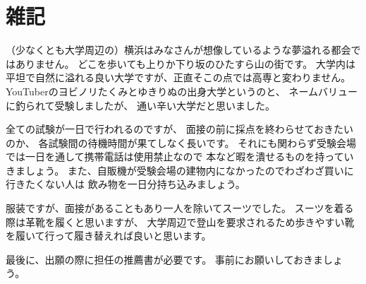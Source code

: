 \documentclass[]{jsarticle}
\begin{document}
\section*{雑記}
    （少なくとも大学周辺の）横浜はみなさんが想像しているような夢溢れる都会ではありません。
    どこを歩いても上りか下り坂のひたすら山の街です。
    大学内は平坦で自然に溢れる良い大学ですが、正直そこの点では高専と変わりません。
    YouTuberのヨビノリたくみとゆきりぬの出身大学というのと、
    ネームバリューに釣られて受験しましたが、
    通い辛い大学だと思いました。

    全ての試験が一日で行われるのですが、
    面接の前に採点を終わらせておきたいのか、
    各試験間の待機時間が果てしなく長いです。
    それにも関わらず受験会場では一日を通して携帯電話は使用禁止なので
    本など暇を潰せるものを持っていきましょう。
    また、自販機が受験会場の建物内になかったのでわざわざ買いに行きたくない人は
    飲み物を一日分持ち込みましょう。

    服装ですが、面接があることもあり一人を除いてスーツでした。
    スーツを着る際は革靴を履くと思いますが、
    大学周辺で登山を要求されるため歩きやすい靴を履いて行って履き替えれば良いと思います。

    最後に、出願の際に担任の推薦書が必要です。
    事前にお願いしておきましょう。
\end{document}
